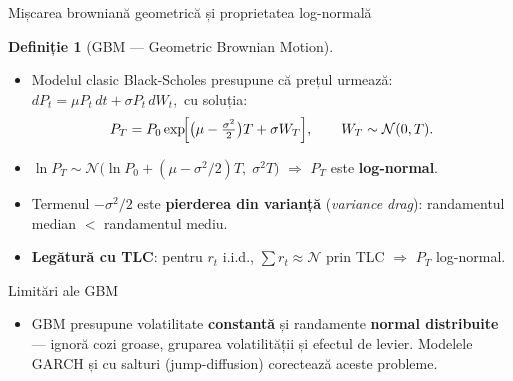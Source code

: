 \documentclass[9pt, aspectratio=169, t]{beamer}
\theoremstyle{definition}
\newtheorem{defn}{Definiție}
\begin{document}
\begin{frame}{Mișcarea browniană geometrică și proprietatea log-normală}
\begin{defn}[GBM --- Geometric Brownian Motion]
\begin{itemize}\setlength{\itemsep}{1pt}
    \item Modelul clasic Black-Scholes presupune că prețul urmează:
    $dP_t = \mu P_t\,dt + \sigma P_t\,dW_t,$
    cu soluția:
    \[
    P_T = P_0 \exp\!\Bigl[\bigl(\mu - \tfrac{\sigma^2}{2}\bigr)T + \sigma W_T\Bigr], \qquad W_T \sim \mathcal{N}(0, T).
    \]
\end{itemize}
\end{defn}
\begin{itemize}\small\setlength{\itemsep}{1pt}
    \item $\ln P_T \sim \mathcal{N}\!\bigl(\ln P_0 + (\mu - \sigma^2/2)T,\;\sigma^2 T\bigr)$ $\Rightarrow$ $P_T$ este \textbf{log-normal}.
    \item Termenul $-\sigma^2/2$ este \textbf{pierderea din varianță} (\textit{variance drag}): randamentul median $<$ randamentul mediu.
    \item \textbf{Legătură cu TLC}: pentru $r_t$ i.i.d., $\sum r_t \approx \mathcal{N}$ prin TLC $\Rightarrow$ $P_T$ log-normal.
\end{itemize}
\vspace{0.1cm}
\begin{alertblock}{Limitări ale GBM}
\begin{itemize}
\item \small GBM presupune volatilitate \textbf{constantă} și randamente \textbf{normal distribuite} --- ignoră cozi groase, gruparea volatilității și efectul de levier. Modelele GARCH și cu salturi (jump-diffusion) corectează aceste probleme.
\end{itemize}
\end{alertblock}
\end{frame}
\end{document}

